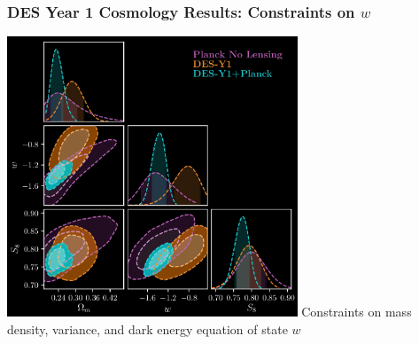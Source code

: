 \documentclass{beamer}
\begin{document}
\frame
{
    \frametitle{DES Year 1 Cosmology Results: Constraints on $w$}


    \begin{center}
        \includegraphics[width=0.65\textwidth]{dpnl_w_inv.png}
        \newline
        Constraints on mass density, variance, and dark energy equation of state $w$
    \end{center}

}
\end{document}
